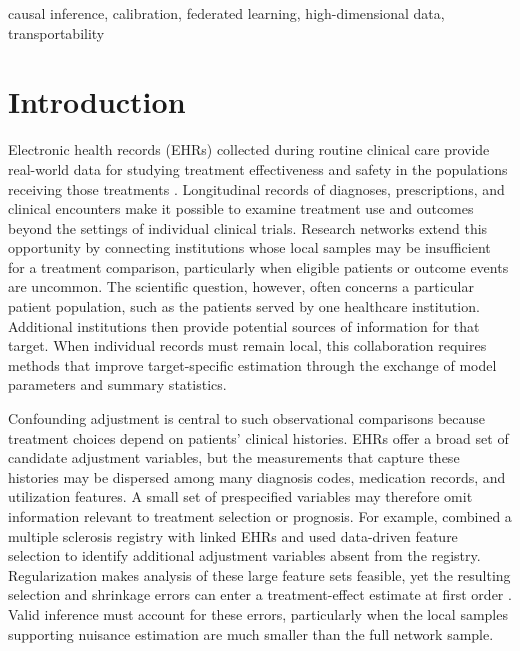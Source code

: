 \documentclass[12pt]{article}
\begin{document}
 causal inference, calibration, federated learning, high-dimensional data, transportability

\vfill
\newpage
{}

\section{Introduction}\label{sec:introduction}

Electronic health records (EHRs) collected during routine clinical care provide real-world data for studying treatment effectiveness and safety in the populations receiving those treatments \citep{sherman2016real,hernan2016using}. Longitudinal records of diagnoses, prescriptions, and clinical encounters make it possible to examine treatment use and outcomes beyond the settings of individual clinical trials. Research networks extend this opportunity by connecting institutions whose local samples may be insufficient for a treatment comparison, particularly when eligible patients or outcome events are uncommon. The scientific question, however, often concerns a particular patient population, such as the patients served by one healthcare institution. Additional institutions then provide potential sources of information for that target. When individual records must remain local, this collaboration requires methods that improve target-specific estimation through the exchange of model parameters and summary statistics.

Confounding adjustment is central to such observational comparisons because treatment choices depend on patients' clinical histories. EHRs offer a broad set of candidate adjustment variables, but the measurements that capture these histories may be dispersed among many diagnosis codes, medication records, and utilization features. A small set of prespecified variables may therefore omit information relevant to treatment selection or prognosis. For example, \citet{hou2021comparison} combined a multiple sclerosis registry with linked EHRs and used data-driven feature selection to identify additional adjustment variables absent from the registry. Regularization makes analysis of these large feature sets feasible, yet the resulting selection and shrinkage errors can enter a treatment-effect estimate at first order \citep{belloni2014inference,chernozhukov2018double}. Valid inference must account for these errors, particularly when the local samples supporting nuisance estimation are much smaller than the full network sample.
\end{document}
